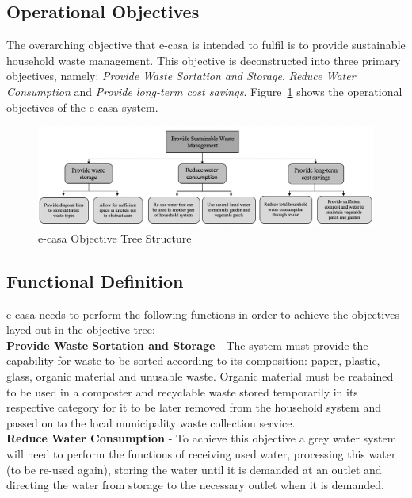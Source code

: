 \documentclass[a4paper,11pt,fleqn]{report}
\begin{document}
\subsection{Operational Objectives}
The overarching objective that \ac{e-casa} is intended to fulfil is to provide sustainable household waste management. This objective is deconstructed into three primary objectives, namely: \textit{Provide Waste Sortation and Storage}, \textit{Reduce Water Consumption} and \textit{Provide long-term cost savings}. Figure~\ref{fig: ecasaOT} shows the operational objectives of the \ac{e-casa} system.\\

\begin{figure}[h!]
\begin{center}
\includegraphics[scale = 0.5]{ecasa_OT.png}
\caption{e-casa Objective Tree Structure}
\label{fig: ecasaOT}
\end{center}
\end{figure}

\subsection{Functional Definition}
\ac{e-casa} needs to perform the following functions in order to achieve the objectives layed out in the objective tree:\\

\noindent\textbf{Provide Waste Sortation and Storage} - The system must provide the capability for waste to be sorted according to its composition: paper, plastic, glass, organic material and unusable waste. Organic material must be reatained to be used in a composter and recyclable waste stored temporarily in its respective category for it to be later removed from the household system and passed on to the local municipality waste collection service.\\

\noindent\textbf{Reduce Water Consumption} - To achieve this objective a grey water system will need to perform the functions of receiving used water, processing this water (to be re-used again), storing the water until it is demanded at an outlet and directing the water from storage to the necessary outlet when it is demanded.\\
\end{document}

